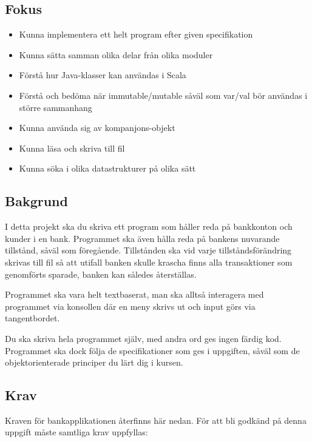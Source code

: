 

\subsection{Fokus}
\begin{itemize}[nosep,label={$\square$},leftmargin=*]
\item Kunna implementera ett helt program efter given specifikation
\item Kunna sätta samman olika delar från olika moduler
\item Förstå hur Java-klasser kan användas i Scala
\item Förstå och bedöma när immutable/mutable såväl som var/val bör användas i större sammanhang
\item Kunna använda sig av kompanjons-objekt
\item Kunna läsa och skriva till fil
\item Kunna söka i olika datastrukturer på olika sätt
\end{itemize}

\subsection{Bakgrund}

I detta projekt ska du skriva ett program som håller reda på bankkonton och kunder i en bank. Programmet ska även hålla reda på bankens nuvarande tillstånd, såväl som föregående.
Tillstånden ska vid varje tillståndsförändring skrivas till fil så att utifall banken skulle krascha finns alla transaktioner som genomförts sparade,  banken kan således återställas.

Programmet ska vara helt textbaserat, man ska alltså interagera med programmet via konsollen där en meny skrivs ut och input görs via tangentbordet.

Du ska skriva hela programmet själv, med andra ord ges ingen färdig kod. Programmet ska dock följa de specifikationer som ges i uppgiften, såväl som de objektorienterade principer du lärt dig i kursen.

\subsection{Krav}

Kraven för bankapplikationen återfinns här nedan. För att bli godkänd på denna uppgift måste samtliga krav uppfyllas:


